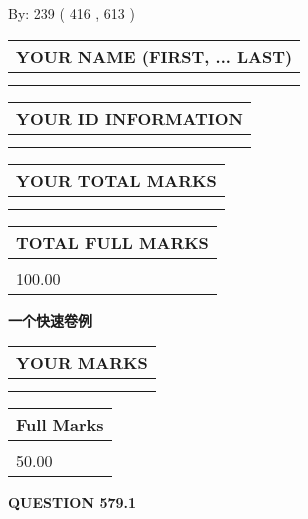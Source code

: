 \documentclass{ctexart}
\begin{document}
   
\hspace{1.0in} By: 
 239 ( 416 ,  613 )
   
   
   
   
\newpage 
\setcounter{page}{ 
   579001 } 
   
   
   
   
\noindent\begin{tabular}{|l|}
\hline
YOUR NAME (FIRST, ... LAST)  \\
\hline
 \\ 
 \\ 
\hline
\end{tabular}
\hspace{0.05in} \begin{tabular}{|l|}
\hline
 YOUR   ID   INFORMATION  \\
\hline
 \\ 
 \\ 
\hline
\end{tabular}
   
   
\vspace{0.2in}\noindent\begin{tabular}{|l|}
\hline
YOUR TOTAL MARKS  \\
\hline
 \\ 
 \\ 
\hline
\end{tabular}
\hspace{0.05in} \begin{tabular}{|l|}
\hline
TOTAL FULL MARKS  \\
\hline
 \\ 
100.00 \\
\hline
\end{tabular}
   
   
 \vspace{0.2in}
{\LARGE {\textbf{ 一个快速卷例}}}
   
   
  
\vspace{0.2in}
  
\noindent\begin{tabular}{|l|}
\hline
 YOUR MARKS  \\
\hline
 \\ 
 \\ 
\hline
\end{tabular}
\hspace{0.05in} \begin{tabular}{|l|}
\hline
 Full Marks  \\
\hline
 \\ 
50.00 \\
\hline
\end{tabular}
{\textbf{\Large{QUESTION
579.1 
}}}
  
\end{document}
